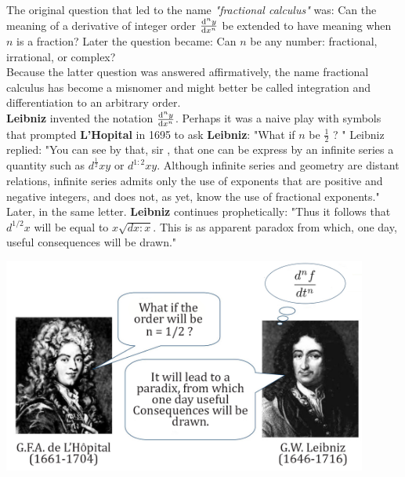\documentclass[twoside]{book}
\begin{document}
{The original question that led to the name \textit{"fractional calculus"} was: Can the meaning of a derivative of integer order $\dv[n]{y}{x}$ be extended to have meaning when $n$ is a fraction? Later the question became: Can $n$ be any number: fractional, irrational, or complex?\\
Because the latter question was answered affirmatively, the name fractional calculus has become a misnomer and might better be called integration and differentiation to an arbitrary order.\\
\newline
\textsf{\textbf{Leibniz}} invented the notation $\dv[n]{y}{x}$. Perhaps it was a naive play with symbols that prompted \textsf{\textbf{L'Hopital}} in 1695 to ask \textsf{\textbf{Leibniz}}: "What if $n$ be $\frac{1}{2}$ ? " Leibniz replied: "You can see by that, sir , that one can be express by an infinite series a quantity such as $d^{\frac{1}{2}} xy$ or $d^{1:2}xy$. Although infinite series and geometry are distant relations, infinite series admits only the use of exponents that are positive and negative integers, and does not, as yet, know the use of fractional exponents." \\
Later, in the same letter. \textsf{\textbf{Leibniz}}  continues prophetically: "Thus it follows that $d^{1/2} x$ will be equal to $x \sqrt{dx:x}$. This is as apparent paradox from which, one day, useful consequences will be drawn."\\

\begin{center}
    \includegraphics[width=0.9\textwidth]{lei.jpg}\par\vspace{0.5cm}
\end{center}

}
\end{document}
